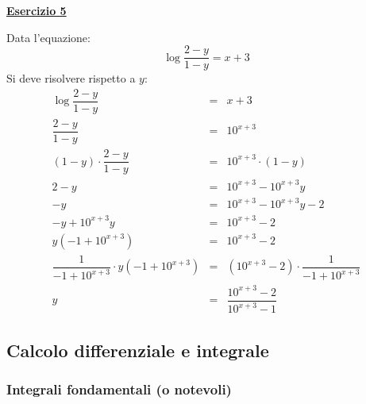 \documentclass[a4paper]{article}
\newcommand{\example}[1]{\textcolor{Green4}{\textbf{#1}}}
\begin{document}
	\begin{flushleft}
		\example{\underline{Esercizio 5}}
	\end{flushleft}

	\noindent
	Data l'equazione:
	\begin{equation*}
		\log{\dfrac{2-y}{1-y}} = x+3
	\end{equation*}
	Si deve risolvere rispetto a $y$:
	\begin{equation*}
		\begin{array}{rcl}
			\log{\dfrac{2-y}{1-y}} &=& x+3 \\ [1em]
			\dfrac{2-y}{1-y} &=& 10^{x+3} \\ [1em]
			\left(1-y\right) \cdot \dfrac{2-y}{1-y} &=& 10^{x+3} \cdot \left(1-y\right) \\ [1em]
			2-y &=& 10^{x+3} - 10^{x+3}y \\ [1em]
			-y &=& 10^{x+3} - 10^{x+3}y -2 \\ [1em]
			-y + 10^{x+3}y &=& 10^{x+3} - 2 \\ [1em]
			y\left(-1 + 10^{x+3}\right) &=& 10^{x+3} - 2 \\ [1em]
			\dfrac{1}{-1 + 10^{x+3}} \cdot y\left(-1 + 10^{x+3}\right) &=& \left(10^{x+3} - 2\right) \cdot \dfrac{1}{-1 + 10^{x+3}} \\ [1em]
			y &=& \dfrac{10^{x+3} - 2}{10^{x+3} - 1}
		\end{array}
	\end{equation*}

	\newpage
	\subsection{Calcolo differenziale e integrale}\label{subsection: calcolo differenziale e integrale}

	\subsubsection{Integrali fondamentali (o notevoli)}\label{subsubsection: integrali fondamentali (o notevoli)}
\end{document}
